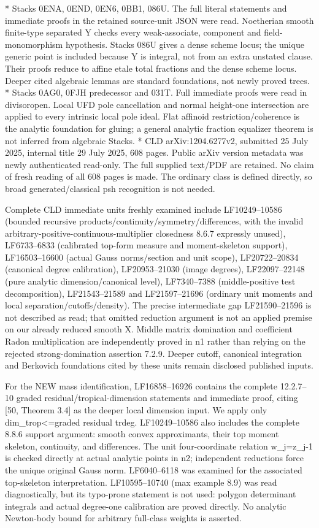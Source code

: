 \documentclass[11pt]{article}
\begin{document}
* Stacks 0ENA, 0END, 0EN6, 0BB1, 086U. The full literal statements and immediate proofs in the retained source-unit JSON were read. Noetherian smooth finite-type separated Y checks every weak-associate, component and field-monomorphism hypothesis. Stacks 086U gives a dense scheme locus; the unique generic point is included because Y is integral, not from an extra unstated clause. Their proofs reduce to affine etale total fractions and the dense scheme locus. Deeper cited algebraic lemmas are standard foundations, not newly proved trees.
* Stacks 0AG0, 0FJH predecessor and 031T. Full immediate proofs were read in divisoropen. Local UFD pole cancellation and normal height-one intersection are applied to every intrinsic local pole ideal. Flat affinoid restriction/coherence is the analytic foundation for gluing; a general analytic fraction equalizer theorem is not inferred from algebraic Stacks.
* CLD arXiv:1204.6277v2, submitted 25 July 2025, internal title 29 July 2025, 608 pages. Public arXiv version metadata was newly authenticated read-only. The full supplied text/PDF are retained. No claim of fresh reading of all 608 pages is made. The ordinary class is defined directly, so broad generated/classical psh recognition is not needed.

Complete CLD immediate units freshly examined include LF10249--10586 (bounded recursive products/continuity/symmetry/differences, with the invalid arbitrary-positive-continuous-multiplier closedness 8.6.7 expressly unused), LF6733--6833 (calibrated top-form measure and moment-skeleton support), LF16503--16600 (actual Gauss norms/section and unit scope), LF20722--20834 (canonical degree calibration), LF20953--21030 (image degrees), LF22097--22148 (pure analytic dimension/canonical level), LF7340--7388 (middle-positive test decomposition), LF21543--21589 and LF21597--21696 (ordinary unit moments and local separation/cutoffs/density). The precise intermediate gap LF21590--21596 is not described as read; that omitted reduction argument is not an applied premise on our already reduced smooth X. Middle matrix domination and coefficient Radon multiplication are independently proved in n1 rather than relying on the rejected strong-domination assertion 7.2.9. Deeper cutoff, canonical integration and Berkovich foundations cited by these units remain disclosed published inputs.

For the NEW mass identification, LF16858--16926 contains the complete 12.2.7--10 graded residual/tropical-dimension statements and immediate proof, citing [50, Theorem 3.4] as the deeper local dimension input. We apply only dim\_trop<=graded residual trdeg. LF10249--10586 also includes the complete 8.8.6 support argument: smooth convex approximants, their top moment skeleton, continuity, and differences. The unit four-coordinate relation w\_j=z\_j-1 is checked directly at actual analytic points in n2; independent reductions force the unique original Gauss norm. LF6040--6118 was examined for the associated top-skeleton interpretation. LF10595--10740 (max example 8.9) was read diagnostically, but its typo-prone statement is not used: polygon determinant integrals and actual degree-one calibration are proved directly. No analytic Newton-body bound for arbitrary full-class weights is asserted.
\end{document}
